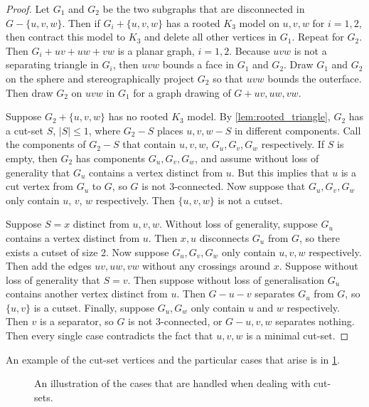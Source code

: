 \begin{proof}
	Let $G_1$ and $G_2$ be the two subgraphs that are disconnected in $G - \{u,v,w\}$. Then if $G_i + \{u,v,w\}$ has a rooted $K_3$ model on $u,v,w$ for $i = 1,2$, then contract this model to $K_3$ and delete all other vertices in $G_1$. Repeat for $G_2$. Then $G_i + uv + uw + vw$ is a planar graph, $i = 1,2$. Because $uvw$ is not a separating triangle in $G_i$, then $uvw$ bounds a face in $G_1$ and $G_2$. Draw $G_1$ and $G_2$ on the sphere and stereographically project $G_2$ so that $uvw$ bounds the outerface. Then draw $G_2$ on $uvw$ in $G_1$ for a graph drawing of $G + uv, uw, vw$. 
	
	Suppose $G_2 + \{u,v,w\}$ has no rooted $K_3$ model. By \cref{lem:rooted_triangle}, $G_2$ has a cut-set $S$, $|S| \leq 1$, where $G_2 - S$ places $u,v,w - S$ in different components. Call the components of $G_2 - S$ that contain $u,v,w$, $G_u, G_v, G_w$ respectively. If $S$ is empty, then $G_2$ has components $G_u, G_v, G_w$, and assume without loss of generality that $G_u$ contains a vertex distinct from $u$. But this implies that $u$ is a cut vertex from $G_u$ to $G$, so $G$ is not $3$-connected. Now suppose that $G_u,G_v, G_w$ only contain $u$, $v$, $w$ respectively. Then $\{u,v,w\}$ is not a cutset. 
	
	Suppose $S = x$ distinct from $u,v,w$. Without loss of generality, suppose $G_u$ contains a vertex distinct from $u$. Then $x, u$ disconnects $G_u$ from $G$, so there exists a cutset of size 2. Now suppose $G_u, G_v, G_w$ only contain $u,v,w$ respectively. Then add the edges $uv, uw, vw$ without any crossings around $x$. Suppose without loss of generality that $S = v$. Then suppose without loss of generalisation $G_u$ contains another vertex distinct from $u$. Then $G - u - v$ separates $G_u$ from $G$, so $\{u,v\}$ is a cutset. Finally, suppose $G_u, G_w$ only contain $u$ and $w$ respectively. Then $v$ is a separator, so $G$ is not $3$-connected, or $G - u,v,w$ separates nothing. Then every single case contradicts the fact that $u,v,w$ is a minimal cut-set.
\end{proof}
An example of the cut-set vertices and the particular cases that arise is in \cref{fig:cutsets}.

\begin{figure}[h!]
	\centering
	
	\caption[Decomposition of graph]{An illustration of the cases that are handled when dealing with cut-sets.}\label{fig:cutsets}
\end{figure}

